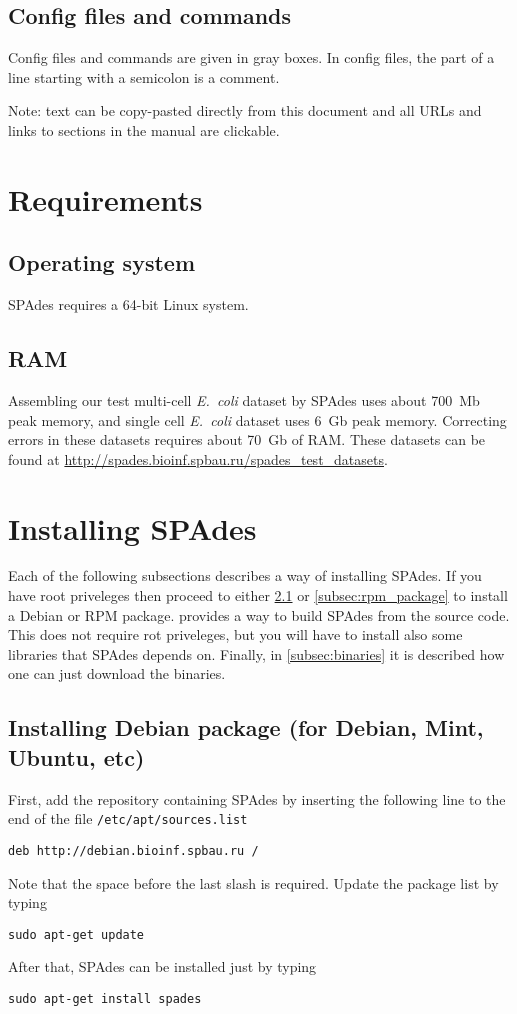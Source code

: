 \documentclass{article}
\def\spades{SPAdes}
\def\ecoli{\it E.~coli}
\begin{document}
\subsection{Config files and commands}
Config files and commands are given in gray boxes. 
In config files, the part of a line starting with a semicolon is a comment.

Note: text can be copy-pasted directly from this document
and all URLs and links to sections in the manual are clickable.


\section{Requirements}
\subsection{Operating system}
{\spades} requires a 64-bit Linux system.

\subsection{RAM}
Assembling our test multi-cell {\ecoli} dataset 
by {\spades} uses about 700~Mb peak memory, and single cell
{\ecoli} dataset uses 6~Gb peak memory. 
Correcting errors in these datasets requires about 70~Gb of RAM.
These datasets can be found at \url{http://spades.bioinf.spbau.ru/spades_test_datasets}.

\section{Installing {\spades}}
Each of the following subsections describes a way of installing {\spades}.
If you have root priveleges then proceed to either \cref{subsec:deb_package}
or \cref{subsec:rpm_package} to install a Debian or RPM package.
 provides a way to build {\spades}
from the source code. This does not require rot priveleges, but 
you will have to install also some libraries that {\spades} depends on.
Finally, in \cref{subsec:binaries} it is described how one can just 
download the binaries.


\subsection{Installing Debian package (for Debian, Mint, Ubuntu, etc)}\label{subsec:deb_package}
First, add the repository containing {\spades} by inserting the following line
to the end of the file {\tt /etc/apt/sources.list}
\begin{lstlisting}
deb http://debian.bioinf.spbau.ru /
\end{lstlisting}
Note that the space before the last slash is required. 
Update the package list by typing
\begin{lstlisting}
sudo apt-get update
\end{lstlisting}
After that, {\spades} can be installed just by typing
\begin{lstlisting}
sudo apt-get install spades
\end{lstlisting}
\end{document}
